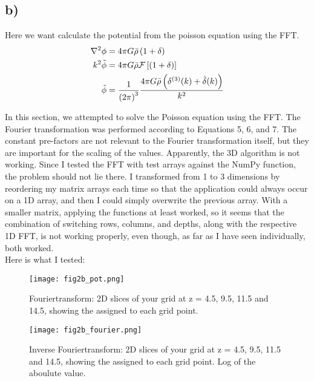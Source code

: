 \subsection{b)}
Here we want calculate the potential from the poisson equation using the FFT. 
\begin{align}
    \nabla^2\phi &= 4 \pi G \Bar{\rho} \left({1+ \delta}\right)\\
    k^2 \Tilde{\phi} &= 4\pi G \Bar{\rho} \mathcal{F}\left[\left({1+\delta}\right)\right] \\
     \Tilde{\phi} &= \frac{1}{\left({2 \pi}\right)^3}\frac{4\pi G \Bar{\rho} \left({\delta^{(3)}(k) + \hat{\delta}(k)}\right)}{k^2}
\end{align}


In this section, we attempted to solve the Poisson equation using the FFT. The Fourier transformation was performed according to Equations 5, 6, and 7. The constant pre-factors are not relevant to the Fourier transformation itself, but they are important for the scaling of the values. Apparently, the 3D algorithm is not working. Since I tested the FFT with test arrays against the NumPy function, the problem should not lie there. I transformed from 1 to 3 dimensions by reordering my matrix arrays each time so that the application could always occur on a 1D array, and then I could simply overwrite the previous array. With a smaller matrix, applying the functions at least worked, so it seems that the combination of switching rows, columns, and depths, along with the respective 1D FFT, is not working properly, even though, as far as I have seen individually, both worked.\\
Here is what I tested:


\begin{figure}[h!]
    \centering
    \texttt{[image: fig2b\_pot.png]}
    \caption{Fouriertransform: 2D slices of your grid at z = 4.5, 9.5, 11.5 and 14.5, showing the assigned to each grid point.}
\end{figure}


\begin{figure}[h!]
    \centering
    \texttt{[image: fig2b\_fourier.png]}
    \caption{Inverse Fouriertransform: 2D slices of your grid at z = 4.5, 9.5, 11.5 and 14.5, showing the assigned to each grid point. Log of the aboulute value.}
\end{figure}






